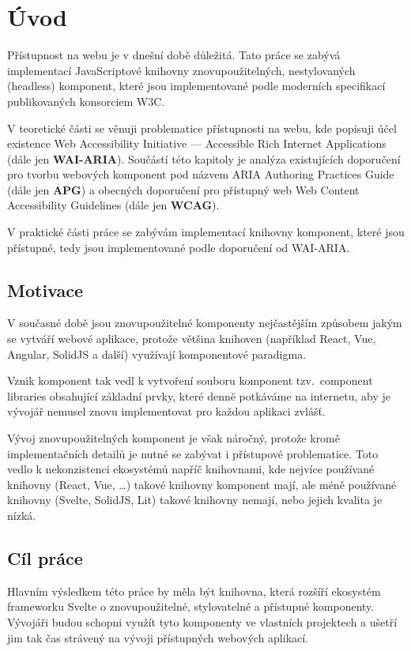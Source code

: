 \chapter{Úvod}

Přístupnost na webu je v dnešní době důležitá. Tato práce se zabývá implementací JavaScriptové knihovny
znovupoužitelných, nestylovaných (headless) komponent, které jsou implementované podle moderních specifikací publikovaných konsorciem W3C.

V teoretické části se věnuji problematice přístupnosti na webu, kde popisuji účel existence
Web Accessibility Initiative --- Accessible Rich Internet Applications (dále jen \textbf{WAI-ARIA}).
Součástí této kapitoly je analýza existujících doporučení pro tvorbu webových
komponent pod názvem ARIA Authoring Practices Guide (dále jen \textbf{APG}) a
obecných doporučení pro přístupný web Web Content Accessibility Guidelines (dále jen \textbf{WCAG}).

V praktické části práce se zabývám implementací knihovny komponent,
které jsou přístupné, tedy jsou implementované podle doporučení od WAI-ARIA.

\section{Motivace}

V současné době jsou znovupoužitelné komponenty nejčastějším způsobem jakým se vytváří webové aplikace, protože většina knihoven (například React, Vue, Angular, SolidJS a další) využívají komponentové paradigma.

Vznik komponent tak vedl k vytvoření souboru komponent tzv.\ component libraries obsahující základní prvky, které denně potkáváme na internetu, aby je vývojář nemusel znovu implementovat pro každou aplikaci zvlášť.

Vývoj znovupoužitelných komponent je však náročný, protože kromě implementačních detailů je nutné se zabývat i přístupové problematice. Toto vedlo k nekonzistenci ekosystémů napříč knihovnami, kde nejvíce používané knihovny (React, Vue, \dots) takové knihovny komponent mají, ale méně používané knihovny (Svelte, SolidJS, Lit) takové knihovny nemají, nebo jejich kvalita je nízká.

\section{Cíl práce}

Hlavním výsledkem této práce by měla být knihovna, která rozšíří ekosystém frameworku Svelte o znovupoužitelné, stylovatelné a přístupné komponenty.
Vývojáři budou schopni využít tyto komponenty ve vlastních projektech a ušetří jim tak čas strávený na vývoji přístupných webových aplikací.
